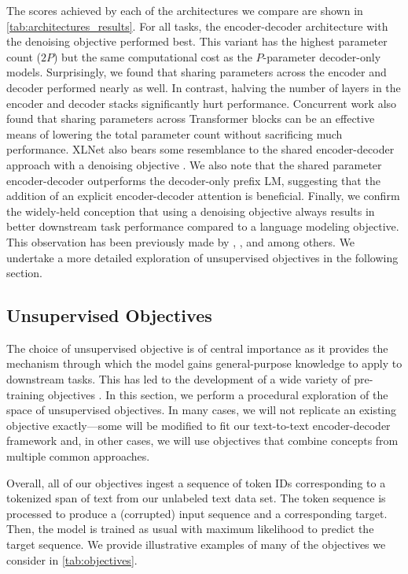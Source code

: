 \documentclass[twoside,11pt]{article}
\begin{document}
The scores achieved by each of the architectures we compare are shown in \cref{tab:architectures_results}.
For all tasks, the encoder-decoder architecture with the denoising objective performed best.
This variant has the highest parameter count ($2P$) but the same computational cost as the $P$-parameter decoder-only models.
Surprisingly, we found that sharing parameters across the encoder and decoder performed nearly as well.
In contrast, halving the number of layers in the encoder and decoder stacks significantly hurt performance.
Concurrent work \citep{lan2019albert} also found that sharing parameters across Transformer blocks can be an effective means of lowering the total parameter count without sacrificing much performance.
XLNet also bears some resemblance to the shared encoder-decoder approach with a denoising objective \citep{yang2019xlnet}.
We also note that the shared parameter encoder-decoder outperforms the decoder-only prefix LM, suggesting that the addition of an explicit encoder-decoder attention is beneficial.
Finally, we confirm the widely-held conception that using a denoising objective always results in better downstream task performance compared to a language modeling objective.
This observation has been previously made by \citet{devlin2018bert}, \citet{voita2019bottom}, and \citet{lample2019cross} among others.
We undertake a more detailed exploration of unsupervised objectives in the following section.

\subsection{Unsupervised Objectives}
\label{sec:objectives}

The choice of unsupervised objective is of central importance as it provides the mechanism through which the model gains general-purpose knowledge to apply to downstream tasks.
This has led to the development of a wide variety of pre-training objectives \citep{dai2015semi,ramachandran2016unsupervised,radford2018improving,devlin2018bert,yang2019xlnet,liu2019multi,wang2019can,song2019mass,dong2019unified,joshi2019spanbert}.
In this section, we perform a procedural exploration of the space of unsupervised objectives.
In many cases, we will not replicate an existing objective exactly---some will be modified to fit our text-to-text encoder-decoder framework and, in other cases, we will use objectives that combine concepts from multiple common approaches.

Overall, all of our objectives ingest a sequence of token IDs corresponding to a tokenized span of text from our unlabeled text data set.
The token sequence is processed to produce a (corrupted) input sequence and a corresponding target.
Then, the model is trained as usual with maximum likelihood to predict the target sequence.
We provide illustrative examples of many of the objectives we consider in \cref{tab:objectives}.
\end{document}
